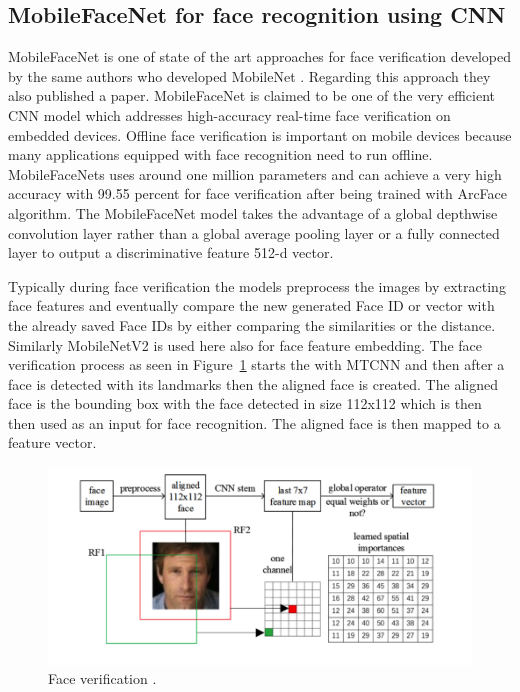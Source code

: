 \subsection{MobileFaceNet for face recognition using CNN}
MobileFaceNet is one of state of the art approaches for face verification developed by the same authors who developed MobileNet \cite{howard2017mobilenets}. Regarding this approach they also published a paper. MobileFaceNet \cite{Chen2018MobileFaceNetsEC} is claimed to be one of the very efficient CNN model which addresses high-accuracy real-time face verification on embedded devices. Offline face verification is important on mobile devices because many applications equipped with face recognition need to run offline. 
MobileFaceNets uses around one million parameters and can achieve a very high accuracy with 99.55 percent for face verification after being trained with ArcFace algorithm. The MobileFaceNet model takes the advantage of a global
depthwise convolution layer rather than a global average pooling layer or a fully
connected layer to output a discriminative feature 512-d vector. 

Typically during face verification the models preprocess the images by extracting face features and eventually compare the new generated Face ID or vector with the already saved Face IDs by either comparing the similarities or the distance. Similarly MobileNetV2 is used here also for face feature embedding. The face verification process as seen in Figure~\ref{fig:face_ver} starts the with MTCNN and then after a face is detected with its landmarks then the aligned face is created. The aligned face is the bounding box with the face detected in size 112x112 which is then then used as an input for face recognition. The aligned face is then mapped to a feature vector. 


\begin{figure}[!htb]
    \centering
    \includegraphics[width=1\textwidth]{figures/face_recognition.png}
    \caption{Face verification \cite{Chen2018MobileFaceNetsEC}.}
    \label{fig:face_ver}
\end{figure}

